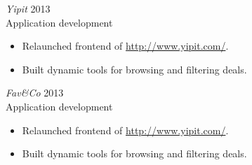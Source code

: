 \documentclass[line,margin]{res}
\begin{document}
\begin{resume}
    {\sl Yipit}
    \hfill 2013 \\
    Application development
    \begin{itemize} \itemsep -2pt
        \item
            Relaunched frontend of \url{http://www.yipit.com/}.
        \item
            Built dynamic tools for browsing and filtering deals.
    \end{itemize}

    {\sl Fav\&Co}
    \hfill 2013 \\
    Application development
    \begin{itemize} \itemsep -2pt
        \item
            Relaunched frontend of \url{http://www.yipit.com/}.
        \item
            Built dynamic tools for browsing and filtering deals.
    \end{itemize}

\end{resume}
\end{document}
